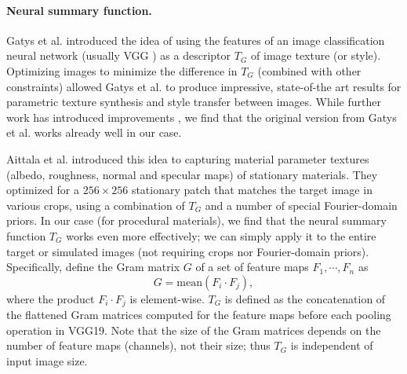 \paragraph{Neural summary function.}
Gatys et al. \cite{Gatys2015,Gatys2016} introduced the idea of using the features of an image classification neural network (usually VGG \cite{VGG}) as a descriptor $T_G$ of image texture (or style). Optimizing images to minimize the difference in $T_G$ (combined with other constraints) allowed Gatys et al. to produce impressive, state-of-the art results for parametric texture synthesis and style transfer between images. While further work  has introduced improvements \cite{Risser2017}, we find that the original version from Gatys et al. works already well in our case.

Aittala et al. \cite{Aittala2016} introduced this idea to capturing material parameter textures (albedo, roughness, normal and specular maps) of stationary materials. They optimized for a $256 \times 256$ stationary patch that matches the target image in various crops, using a combination of $T_G$ and a number of special Fourier-domain priors. In our case (for procedural materials), we find that the neural summary function $T_G$ works even more effectively; we can simply apply it to the entire target or simulated images (not requiring crops nor Fourier-domain priors).
%
Specifically, define the Gram matrix $G$ of a set of feature maps $F_1, \cdots, F_n$ as
\begin{equation}
	G = \mbox{mean}(F_i \cdot F_j),
\end{equation}
where the product $F_i \cdot F_j$ is element-wise. $T_G$ is defined as the concatenation of the flattened Gram matrices computed for the feature maps before each pooling operation in VGG19. Note that the size of the Gram matrices depends on the number of feature maps (channels), not their size; thus $T_G$ is independent of input image size.

